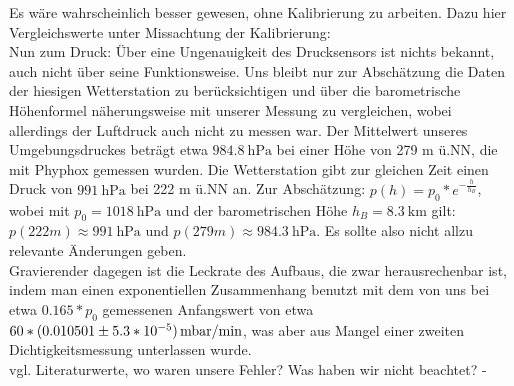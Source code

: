 \documentclass[]{article}
\begin{document}
	Es wäre wahrscheinlich besser gewesen, ohne Kalibrierung zu arbeiten. {\color{red}Dazu hier Vergleichswerte unter Missachtung der Kalibrierung}:\\
	Nun zum Druck: Über eine Ungenauigkeit des Drucksensors ist nichts bekannt, auch nicht über seine Funktionsweise. Uns bleibt nur zur Abschätzung die Daten der hiesigen Wetterstation zu berücksichtigen und über die barometrische Höhenformel näherungsweise mit unserer Messung zu vergleichen, wobei allerdings der Luftdruck auch nicht zu messen war. Der Mittelwert unseres Umgebungsdruckes beträgt etwa $\SI{984.8}{\hecto \pascal}$ bei einer Höhe von 279 m ü.NN, die mit Phyphox gemessen wurden. Die Wetterstation gibt zur gleichen Zeit einen Druck von $\SI{991}{\hecto \pascal}$ bei 222 m ü.NN an. Zur Abschätzung: $p(h)=p_0*e^{-\frac{h}{h_B}}$, wobei mit $p_0=\SI{1018}{\hecto \pascal}$ und der barometrischen Höhe $h_B=\SI{8.3}{\kilo \meter}$ gilt: $p(222m) \approx \SI{991}{\hecto \pascal}$ und $p(279m) \approx \SI{984.3}{\hecto \pascal}$. Es sollte also nicht allzu relevante Änderungen geben.\\
	Gravierender dagegen ist die Leckrate des Aufbaus, die zwar herausrechenbar ist, indem man einen exponentiellen Zusammenhang benutzt mit dem von uns bei etwa $0.165*p_0$ gemessenen Anfangswert von etwa $60*(0.010501 \pm 5.3*10^{-5})\SI{}{ \, \milli \bar /{\minute}}$, was aber aus Mangel einer zweiten Dichtigkeitsmessung unterlassen wurde. \\
	{\color{red}vgl. Literaturwerte, wo waren unsere Fehler? Was haben wir nicht beachtet? - }
\end{document}

